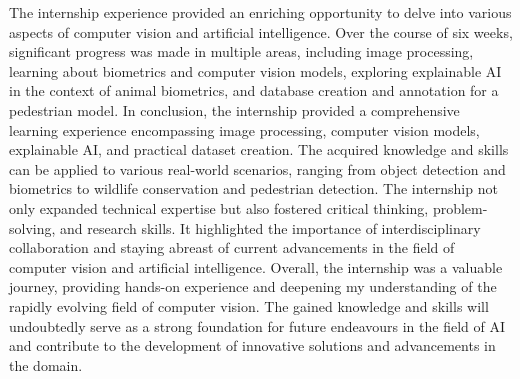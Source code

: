 \documentclass{article}
\begin{document}
The internship experience provided an enriching opportunity to delve into various aspects of computer vision and artificial intelligence. Over the course of six weeks, significant progress was made in multiple areas, including image processing, learning about biometrics and computer vision models, exploring explainable AI in the context of animal biometrics, and database creation and annotation for a pedestrian model.
In conclusion, the internship provided a comprehensive learning experience encompassing image processing, computer vision models, explainable AI, and practical dataset creation. The acquired knowledge and skills can be applied to various real-world scenarios, ranging from object detection and biometrics to wildlife conservation and pedestrian detection.
\newline
The internship not only expanded technical expertise but also fostered critical thinking, problem-solving, and research skills. It highlighted the importance of interdisciplinary collaboration and staying abreast of current advancements in the field of computer vision and artificial intelligence.
\newline
Overall, the internship was a valuable journey, providing hands-on experience and deepening my understanding of the rapidly evolving field of computer vision. The gained knowledge and skills will undoubtedly serve as a strong foundation for future endeavours in the field of AI and contribute to the development of innovative solutions and advancements in the domain.
\end{document}
